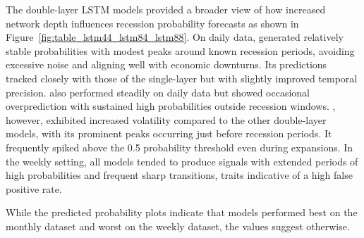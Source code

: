 \vspace{-21pt}

The double-layer LSTM models provided a broader view of how increased network depth influences recession probability forecasts as shown in Figure~\ref{fig:table_lstm44_lstm84_lstm88}.
On daily data, \LSTMFF generated relatively stable probabilities with modest peaks around known recession periods, avoiding excessive noise and aligning well with economic downturns. Its predictions tracked closely with those of the single-layer \LSTMF but with slightly improved temporal precision. \LSTMEF also performed steadily on daily data but showed occasional overprediction with sustained high probabilities outside recession windows. \LSTMEE, however, exhibited increased volatility compared to the other double-layer models, with its prominent peaks occurring just before recession periods. It frequently spiked above the 0.5 probability threshold even during expansions.
In the weekly setting, all models tended to produce signals with extended periods of high probabilities and frequent sharp transitions, traits indicative of a high false positive rate. 
 
While the predicted probability plots indicate that models performed best on the monthly dataset and worst on the weekly dataset, the \AUCone values suggest otherwise.




